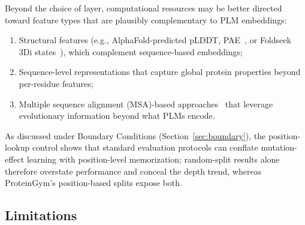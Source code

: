 \documentclass[numbered,webpdf,modern,large]{oup-authoring-template}
\newcommand{\rone}[1]{#1}
\newcommand{\rtwo}[1]{#1}
\begin{document}
\rtwo{Beyond the choice of layer}, computational resources may be better directed toward feature types
that are plausibly complementary to PLM embeddings:
\begin{enumerate}
    \item Structural features (e.g., AlphaFold-predicted pLDDT, PAE~\cite{jumper2021alphafold},
          or Foldseek 3Di states~\cite{vankempen2024foldseek}), which complement
          sequence-based embeddings;
    \item Sequence-level representations that capture global protein properties
          beyond per-residue features;
    \item Multiple sequence alignment (MSA)-based approaches~\cite{riesselman2018deepsequence,
          hopf2017mutation} that leverage evolutionary information beyond what PLMs encode.
\end{enumerate}

As discussed under Boundary Conditions (Section~\rtwo{\ref{sec:boundary}}), \rone{the position-lookup
control shows that} standard evaluation protocols can conflate mutation-effect learning with
position-level memorization\rtwo{; random-split results alone therefore overstate
performance and conceal the depth trend, whereas ProteinGym's position-based splits
expose both}.

\subsection{Limitations}
\end{document}
